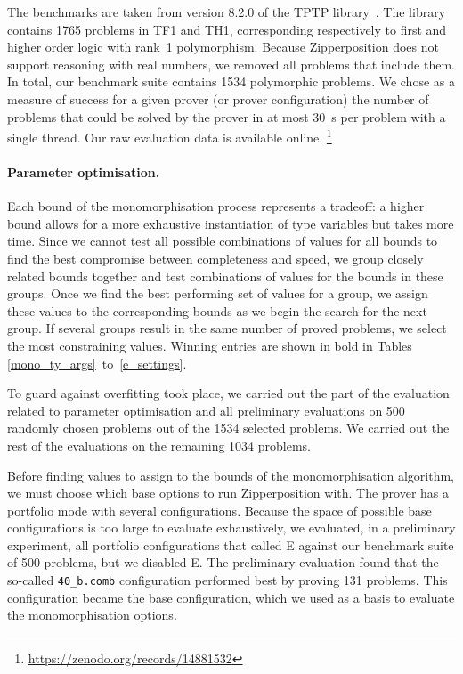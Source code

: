 \documentclass[runningheads]{llncs}
\begin{document}
The benchmarks are taken from version 8.2.0 of the TPTP library~\cite{tptp}. The library contains 1765 problems in TF1 and TH1, corresponding respectively to first and higher order logic with rank~1 polymorphism. Because Zipperposition does not support reasoning with real numbers, we removed all problems that include them. In total, our benchmark suite contains 1534 polymorphic problems. We chose as a measure of success for a given prover (or prover configuration) the number of problems
that could be solved by the prover in at most 30~s
per problem with a single thread.
Our raw evaluation data is available online.%
\footnote{\url{https://zenodo.org/records/14881532}}


\paragraph{\upshape\bfseries Parameter optimisation.}

Each bound of the monomorphisation process represents a tradeoff: a higher bound allows for a more exhaustive instantiation of type variables but takes more time. Since we cannot test all possible combinations of values for all bounds to find the best compromise between completeness and speed,
we group closely related bounds together and test combinations of values for the bounds in these groups. Once we find the best performing set of values for a group, we assign these values to the corresponding bounds as we begin the search for the next group. If several groups result in the same number of proved problems, we select the most constraining values. Winning entries are shown in bold in Tables \ref{mono_ty_args}~to~\ref{e_settings}.

To guard against overfitting took place, we carried out the part of the evaluation related to parameter optimisation and all preliminary evaluations on 500 randomly chosen problems out of the 1534 selected problems. We carried out the rest of the evaluations on the remaining 1034 problems.

Before finding values to assign to the bounds of the monomorphisation algorithm, we must choose which base options to run Zipperposition with. The prover has a portfolio mode with several configurations. Because the space of possible base configurations is too large to evaluate exhaustively, we evaluated, in a preliminary experiment, all portfolio configurations that called E against our benchmark suite of 500 problems, but we disabled E.
The preliminary evaluation found that the so-called \verb|40_b.comb| configuration performed best by proving 131 problems.
This configuration became the base configuration, which we used as a basis to evaluate the monomorphisation options.
\end{document}
